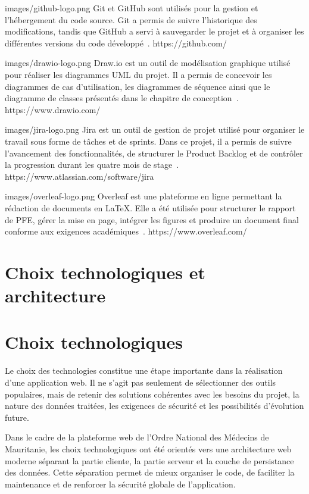 ﻿\documentclass[12pt,a4paper]{report}
\begin{document}
\outil
{images/github-logo.png}
{Git et GitHub}
{sont utilisés pour la gestion et l'hébergement du code source. Git a permis
de suivre l'historique des modifications, tandis que GitHub a servi à
sauvegarder le projet et à organiser les différentes versions du code
développé~\cite{githubDocs}.}
{https://github.com/}

\outil
{images/drawio-logo.png}
{Draw.io}
{est un outil de modélisation graphique utilisé pour réaliser les diagrammes
UML du projet. Il a permis de concevoir les diagrammes de cas d'utilisation,
les diagrammes de séquence ainsi que le diagramme de classes présentés dans
le chapitre de conception~\cite{drawioDocs}.}
{https://www.drawio.com/}

\outil
{images/jira-logo.png}
{Jira}
{est un outil de gestion de projet utilisé pour organiser le travail sous
forme de tâches et de sprints. Dans ce projet, il a permis de suivre
l'avancement des fonctionnalités, de structurer le Product Backlog et de
contrôler la progression durant les quatre mois de stage~\cite{jiraDocs}.}
{https://www.atlassian.com/software/jira}

\outil
{images/overleaf-logo.png}
{Overleaf}
{est une plateforme en ligne permettant la rédaction de documents en
\LaTeX. Elle a été utilisée pour structurer le rapport de PFE, gérer la mise
en page, intégrer les figures et produire un document final conforme aux
exigences académiques~\cite{overleafDocs}.}
{https://www.overleaf.com/}
\section{Choix technologiques et architecture}
\section{Choix technologiques}

Le choix des technologies constitue une étape importante dans la réalisation
d'une application web. Il ne s'agit pas seulement de sélectionner des outils
populaires, mais de retenir des solutions cohérentes avec les besoins du
projet, la nature des données traitées, les exigences de sécurité et les
possibilités d'évolution future.

Dans le cadre de la plateforme web de l'Ordre National des Médecins de
Mauritanie, les choix technologiques ont été orientés vers une architecture
web moderne séparant la partie cliente, la partie serveur et la couche de
persistance des données. Cette séparation permet de mieux organiser le code,
de faciliter la maintenance et de renforcer la sécurité globale de
l'application.
\end{document}
